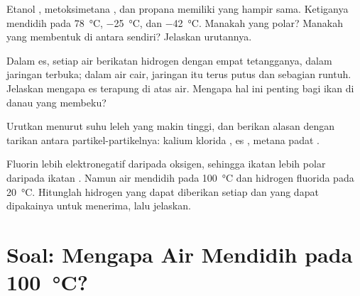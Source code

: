 \begin{exercise}[$\star\star\star$]\label{exo:g11:polarity-and-cohesion:12}
Etanol , metoksimetana , dan propana
 memiliki  yang hampir sama. Ketiganya
mendidih pada \qty{78}{\celsius}, \qty{-25}{\celsius}, dan
\qty{-42}{\celsius}. Manakah yang polar? Manakah yang membentuk  di antara  sendiri? Jelaskan urutannya.
\end{exercise}

\begin{exercise}[$\star\star\star$]\label{exo:g11:polarity-and-cohesion:13}
Dalam es, setiap  air berikatan hidrogen dengan empat
tetangganya, dalam jaringan terbuka; dalam air cair, jaringan itu terus
putus dan sebagian runtuh. Jelaskan mengapa es terapung di atas air.
Mengapa hal ini penting bagi ikan di danau yang membeku?
\end{exercise}

\begin{exercise}[$\star\star\star$]\label{exo:g11:polarity-and-cohesion:14}
Urutkan menurut suhu leleh yang makin tinggi, dan berikan alasan dengan
tarikan antara partikel-partikelnya: kalium klorida , es
, metana padat .
\end{exercise}

\begin{exercise}[$\star\star\star$]\label{exo:g11:polarity-and-cohesion:15}
Fluorin lebih elektronegatif daripada oksigen, sehingga ikatan 
lebih polar daripada ikatan . Namun air mendidih pada
\qty{100}{\celsius} dan hidrogen fluorida pada \qty{20}{\celsius}.
Hitunglah  hidrogen yang dapat diberikan setiap  dan  yang dapat dipakainya untuk menerima, lalu jelaskan.
\end{exercise}

\section{Soal: Mengapa Air Mendidih pada \texorpdfstring{\qty{100}{\celsius}}{100 derajat Celsius}?}

